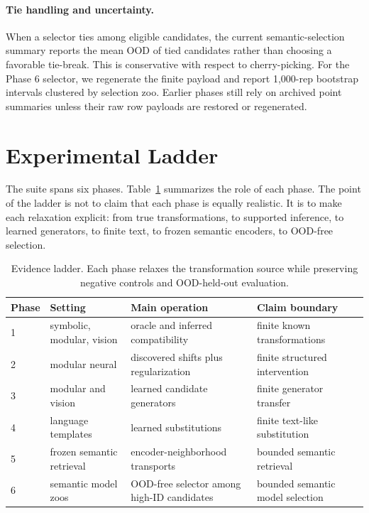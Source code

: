 \documentclass[10pt,twocolumn]{article}
\begin{document}
\paragraph{Tie handling and uncertainty.}
When a selector ties among eligible candidates, the current semantic-selection
summary reports the mean OOD of tied candidates rather than choosing a favorable
tie-break. This is conservative with respect to cherry-picking. For the Phase 6
selector, we regenerate the finite payload and report 1,000-rep bootstrap
intervals clustered by selection zoo. Earlier phases still rely on archived
point summaries unless their raw row payloads are restored or regenerated.

\section{Experimental Ladder}

The suite spans six phases. Table~\ref{tab:ladder} summarizes the role of each
phase. The point of the ladder is not to claim that each phase is equally
realistic. It is to make each relaxation explicit: from true transformations, to
supported inference, to learned generators, to finite text, to frozen semantic
encoders, to OOD-free selection.

\begin{table}[t]
\centering
\small
\begin{tabular}{llll}
\toprule
Phase & Setting & Main operation & Claim boundary \\
\midrule
1 & symbolic, modular, vision & oracle and inferred compatibility & finite known transformations \\
2 & modular neural & discovered shifts plus regularization & finite structured intervention \\
3 & modular and vision & learned candidate generators & finite generator transfer \\
4 & language templates & learned substitutions & finite text-like substitution \\
5 & frozen semantic retrieval & encoder-neighborhood transports & bounded semantic retrieval \\
6 & semantic model zoos & OOD-free selector among high-ID candidates & bounded semantic model selection \\
\bottomrule
\end{tabular}
\caption{Evidence ladder. Each phase relaxes the transformation source while
preserving negative controls and OOD-held-out evaluation.}
\label{tab:ladder}
\end{table}
\end{document}
